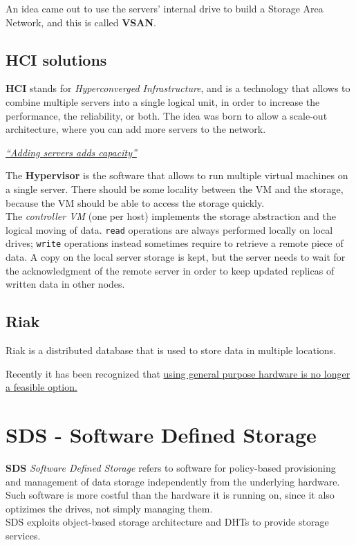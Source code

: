 An idea came out to use the servers' internal drive to build a Storage Area Network, and this is called \textbf{VSAN}.

\subsection{HCI solutions}
\textbf{HCI} stands for \textit{Hyperconverged Infrastructure}, and is a technology that allows to combine multiple servers into a single logical unit, in order to increase the performance, the reliability, or both. 
The idea was born to allow a scale-out architecture, where you can add more servers to the network.

\begin{center}
   \ul{\textit{``Adding servers adds capacity''}}
\end{center}

The \textbf{Hypervisor} is the software that allows to run multiple virtual machines on a single server. There should be some locality between the VM and the storage, because the VM should be able to access the storage quickly.\\
The \textit{controller VM} (one per host) implements the storage abstraction and the logical moving of data.
\texttt{read} operations are always performed locally on local drives; \texttt{write} operations instead sometimes require to retrieve a remote piece of data.
A copy on the local server storage is kept, but the server needs to wait for the acknowledgment of the remote server in order to keep updated replicas of written data in other nodes.

\subsection*{Riak}
Riak is a distributed database that is used to store data in multiple locations. 

Recently it has been recognized that \ul{using general purpose hardware is no longer a feasible option.}

\section{SDS - Software Defined Storage}
\textbf{SDS} \textit{Software Defined Storage} refers to software for policy-based provisioning and management of data storage independently from the underlying hardware.
Such software is more costful than the hardware it is running on, since it also optizimes the drives, not simply managing them.\\
SDS exploits object-based storage architecture and DHTs to provide storage services.